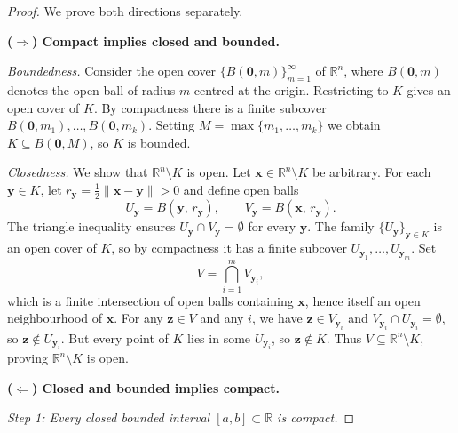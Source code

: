 \documentclass{article}
\theoremstyle{definition}
\theoremstyle{remark}
\begin{document}
\begin{proof}
We prove both directions separately.

\medskip
\noindent\textbf{($\Rightarrow$) Compact implies closed and bounded.}

\smallskip
\textit{Boundedness.}
Consider the open cover $\{ B(\mathbf{0}, m) \}_{m=1}^{\infty}$ of
$\mathbb{R}^n$, where $B(\mathbf{0}, m)$ denotes the open ball of radius
$m$ centred at the origin.  Restricting to $K$ gives an open cover of $K$.
By compactness there is a finite subcover
$B(\mathbf{0}, m_1), \dots, B(\mathbf{0}, m_k)$.
Setting $M = \max\{m_1, \dots, m_k\}$ we obtain $K \subseteq B(\mathbf{0}, M)$,
so $K$ is bounded.

\smallskip
\textit{Closedness.}
We show that $\mathbb{R}^n \setminus K$ is open.
Let $\mathbf{x} \in \mathbb{R}^n \setminus K$ be arbitrary.
For each $\mathbf{y} \in K$, let $r_{\mathbf{y}} = \tfrac{1}{2}
\|\mathbf{x} - \mathbf{y}\| > 0$ and define open balls
\[
    U_{\mathbf{y}} = B\!\left(\mathbf{y},\, r_{\mathbf{y}}\right),
    \qquad
    V_{\mathbf{y}} = B\!\left(\mathbf{x},\, r_{\mathbf{y}}\right).
\]
The triangle inequality ensures $U_{\mathbf{y}} \cap V_{\mathbf{y}} = \emptyset$
for every $\mathbf{y}$.
The family $\{U_{\mathbf{y}}\}_{\mathbf{y} \in K}$ is an open cover of $K$,
so by compactness it has a finite subcover
$U_{\mathbf{y}_1}, \dots, U_{\mathbf{y}_m}$.
Set
\[
    V = \bigcap_{i=1}^{m} V_{\mathbf{y}_i},
\]
which is a finite intersection of open balls containing $\mathbf{x}$,
hence itself an open neighbourhood of $\mathbf{x}$.
For any $\mathbf{z} \in V$ and any $i$, we have
$\mathbf{z} \in V_{\mathbf{y}_i}$ and $V_{\mathbf{y}_i} \cap U_{\mathbf{y}_i} = \emptyset$,
so $\mathbf{z} \notin U_{\mathbf{y}_i}$.
But every point of $K$ lies in some $U_{\mathbf{y}_i}$, so $\mathbf{z} \notin K$.
Thus $V \subseteq \mathbb{R}^n \setminus K$, proving $\mathbb{R}^n \setminus K$
is open.

\medskip
\noindent\textbf{($\Leftarrow$) Closed and bounded implies compact.}

\smallskip
\textit{Step 1: Every closed bounded interval $[a, b] \subset \mathbb{R}$ is compact.}


\end{proof}
\end{document}
